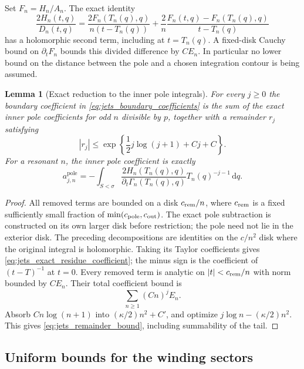 \documentclass[11pt]{article}
\numberwithin{equation}{section}
\newtheorem{lemma}[theorem]{Lemma}
\theoremstyle{definition}
\newcommand{\dd}{\,\mathrm d}
\begin{document}
Set $F_n=H_n/A_n$. The exact identity
\begin{equation}\label{eq:jets_divided_difference}
 \frac{2H_n(t,q)}{D_n(t,q)}=
 \frac{2F_n(T_n(q),q)}{n(t-T_n(q))}
 +\frac2n\frac{F_n(t,q)-F_n(T_n(q),q)}{t-T_n(q)}
\end{equation}
has a holomorphic second term, including at $t=T_n(q)$. A
fixed-disk Cauchy bound on $\partial_tF_n$ bounds this divided
difference by $CE_n$. In particular no lower bound on the distance
between the pole and a chosen integration contour is being assumed.

\begin{lemma}[Exact reduction to the inner pole integrals]
\label{lem:jets_remainder}
For every $j\ge0$ the boundary coefficient in
\eqref{eq:jets_boundary_coefficients} is the sum of the exact inner
pole coefficients for odd $n$ divisible by $p$, together with a
remainder $r_j$ satisfying
\begin{equation}\label{eq:jets_remainder_bound}
 |r_j|\le \exp\left\{\frac12j\log(j+1)+Cj+C\right\}.
\end{equation}
For a resonant $n$, the inner pole coefficient is exactly
\begin{equation}\label{eq:jets_exact_residue_coefficient}
 a_{j,n}^{\mathrm{pole}}=
 -\int_{S<\sigma}
  \frac{2H_n(T_n(q),q)}{\partial_t\Gamma_n(T_n(q),q)}
  T_n(q)^{-j-1}\dd q.
\end{equation}
\end{lemma}

\begin{proof}
All removed terms are bounded on a disk $c_{\rm rem}/n$, where
$c_{\rm rem}$ is a fixed sufficiently small fraction of
$\min(c_{\rm pole},c_{\rm out})$. The exact pole subtraction is
constructed on its own larger disk before restriction; the pole need
not lie in the exterior disk. The preceding decompositions are identities on the $c/n^2$ disk
where the original integral is holomorphic. Taking its Taylor
coefficients gives \eqref{eq:jets_exact_residue_coefficient}; the
minus sign is the coefficient of $(t-T)^{-1}$ at $t=0$. Every
removed term is analytic on $|t|<c_{\rm rem}/n$ with norm bounded by $CE_n$.
Their total coefficient bound is
\[
 \sum_{n\ge1}(Cn)^j E_n.
\]
Absorb $Cn\log(n+1)$ into $(\kappa/2)n^2+C'$, and optimize
$j\log n-(\kappa/2)n^2$. This gives
\eqref{eq:jets_remainder_bound}, including summability of the tail.
\end{proof}

\subsection{Uniform bounds for the winding sectors}
\end{document}
